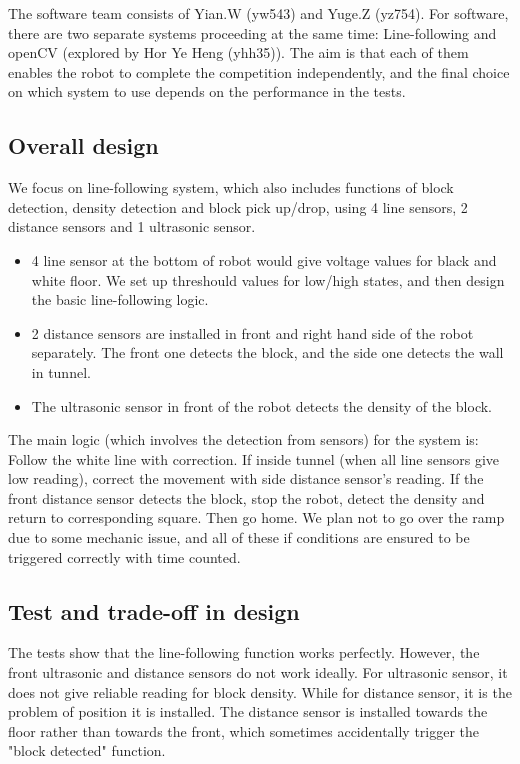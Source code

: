 \documentclass{article}
\begin{document}
\quad The software team consists of Yian.W (yw543) and Yuge.Z (yz754). For software, there are two separate systems proceeding at the same time: Line-following and openCV (explored by Hor Ye Heng (yhh35)). The aim is that each of them enables the robot to complete the competition independently, and the final choice on which system to use depends on the performance in the tests.
\subsection{Overall design}
We focus on line-following system, which also includes functions of block detection, density detection and block pick up/drop, using 4 line sensors, 2 distance sensors and 1 ultrasonic sensor.
\begin{itemize}
    \item 4 line sensor at the bottom of robot would give voltage values for black and white floor. We set up threshould values for low/high states, and then design the basic line-following logic.
    \item 2 distance sensors are installed in front and right hand side of the robot separately. The front one detects the block, and the side one detects the wall in tunnel.
    \item The ultrasonic sensor in front of the robot detects the density of the block.
\end{itemize}

The main logic (which involves the detection from sensors) for the system is: Follow the white line with correction. If inside tunnel (when all line sensors give low reading), correct the movement with side distance sensor's reading.
If the front distance sensor detects the block, stop the robot, detect the density and return to corresponding square. Then go home. We plan not to go over the ramp due to some mechanic issue, and all of these if conditions are ensured to be triggered correctly with time counted.

\subsection{Test and trade-off in design}
The tests show that the line-following function works perfectly. However, the front ultrasonic and distance sensors do not work ideally. For ultrasonic sensor, it does not give reliable reading for block density. While for distance sensor, it is the problem of position it is installed.
The distance sensor is installed towards the floor rather than towards the front, which sometimes accidentally trigger the "block detected" function.
\end{document}
